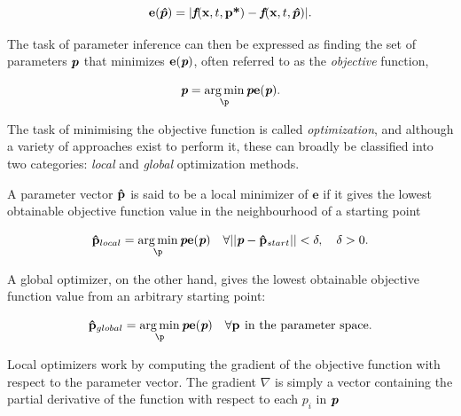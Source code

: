 \documentclass[bsc,frontabs,singlespacing,parskip,deptreport]{infthesis}
\begin{document}
\begin{equation}
    \textbf{e}(\bm{\hat{p}}) = |\textit{\textbf{f}}(\textbf{x}, t, \textbf{p*}) - \textit{\textbf{f}}(\textbf{x}, t, \bm{\hat{p}})|.
\end{equation}

The task of parameter inference can then be expressed as finding the set of parameters $\textit{\textbf{p}}$ that minimizes $\mathbf{e}(\textit{\textbf{p}})$, often referred to as the \textit{objective} function, 

\begin{equation}
    \textit{\textbf{p}} = \operatorname*{arg\,min}_\p \textit{\textbf{p}} \textbf{e}(\textit{\textbf{p}} ).
\end{equation}

The task of minimising the objective function is called \textit{optimization}, and although a variety of approaches exist to perform it, these can broadly be classified into two categories: \textit{local} and \textit{global} optimization methods.

A parameter vector $\bf{\hat{p}}$ is said to be a local minimizer of $\textbf{e}$ if it gives the lowest obtainable objective function value in the neighbourhood of a starting point

\begin{equation}
    \mathbf{\hat{p}}_{local} = \operatorname*{arg\,min}_\p \textit{\textbf{p}} \textbf{e}(\textit{\textbf{p}})  \quad \forall || \textit{\textbf{p}} - \mathbf{\hat{p}}_{start} || < \delta, \quad \delta > 0.
\end{equation}

A global optimizer, on the other hand, gives the lowest obtainable objective function value from an arbitrary starting point:

\newcommand{\Hquad}{\hspace{0.4em}} 

\begin{equation}
    \mathbf{\hat{p}}_{global} = \operatorname*{arg\,min}_\p \textit{\textbf{p}} \textbf{e}(\textit{\textbf{p}})  \quad \forall \mathbf{p} \Hquad \text{in the parameter space}.
\end{equation}

Local optimizers work by computing the gradient of the objective function with respect to the parameter vector. The gradient $\nabla$ is simply a vector containing the partial derivative of the function with respect to each $\textit{p}_{i}$ in $\textit{\textbf{p}}$
\end{document}
